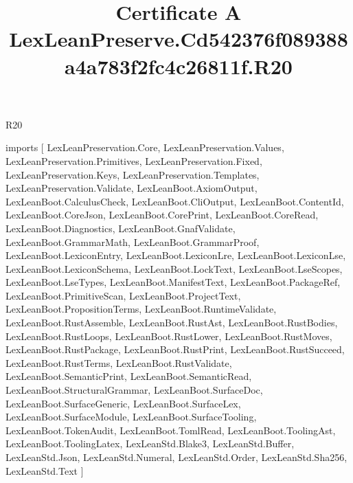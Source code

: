 \begin{lexlean}{R20}
\title{Certificate A LexLeanPreserve.Cd542376f089388a4a783f2fc4c26811f.R20}
\begin{coremodule}
imports [
  LexLeanPreservation.Core,
  LexLeanPreservation.Values,
  LexLeanPreservation.Primitives,
  LexLeanPreservation.Fixed,
  LexLeanPreservation.Keys,
  LexLeanPreservation.Templates,
  LexLeanPreservation.Validate,
  LexLeanBoot.AxiomOutput,
  LexLeanBoot.CalculusCheck,
  LexLeanBoot.CliOutput,
  LexLeanBoot.ContentId,
  LexLeanBoot.CoreJson,
  LexLeanBoot.CorePrint,
  LexLeanBoot.CoreRead,
  LexLeanBoot.Diagnostics,
  LexLeanBoot.GnafValidate,
  LexLeanBoot.GrammarMath,
  LexLeanBoot.GrammarProof,
  LexLeanBoot.LexiconEntry,
  LexLeanBoot.LexiconLre,
  LexLeanBoot.LexiconLse,
  LexLeanBoot.LexiconSchema,
  LexLeanBoot.LockText,
  LexLeanBoot.LseScopes,
  LexLeanBoot.LseTypes,
  LexLeanBoot.ManifestText,
  LexLeanBoot.PackageRef,
  LexLeanBoot.PrimitiveScan,
  LexLeanBoot.ProjectText,
  LexLeanBoot.PropositionTerms,
  LexLeanBoot.RuntimeValidate,
  LexLeanBoot.RustAssemble,
  LexLeanBoot.RustAst,
  LexLeanBoot.RustBodies,
  LexLeanBoot.RustLoops,
  LexLeanBoot.RustLower,
  LexLeanBoot.RustMoves,
  LexLeanBoot.RustPackage,
  LexLeanBoot.RustPrint,
  LexLeanBoot.RustSucceed,
  LexLeanBoot.RustTerms,
  LexLeanBoot.RustValidate,
  LexLeanBoot.SemanticPrint,
  LexLeanBoot.SemanticRead,
  LexLeanBoot.StructuralGrammar,
  LexLeanBoot.SurfaceDoc,
  LexLeanBoot.SurfaceGeneric,
  LexLeanBoot.SurfaceLex,
  LexLeanBoot.SurfaceModule,
  LexLeanBoot.SurfaceTooling,
  LexLeanBoot.TokenAudit,
  LexLeanBoot.TomlRead,
  LexLeanBoot.ToolingAst,
  LexLeanBoot.ToolingLatex,
  LexLeanStd.Blake3,
  LexLeanStd.Buffer,
  LexLeanStd.Json,
  LexLeanStd.Numeral,
  LexLeanStd.Order,
  LexLeanStd.Sha256,
  LexLeanStd.Text
]


\end{coremodule}
\end{lexlean}
